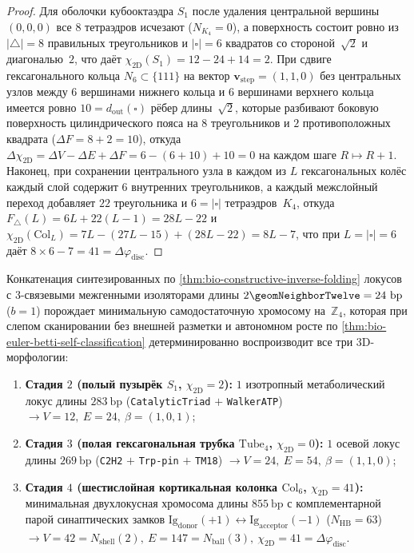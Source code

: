 \begin{proof}
Для оболочки кубооктаэдра $S_1$ после удаления центральной вершины $(0,0,0)$ все $8$ тетраэдров исчезают ($N_{K_4}=0$), а поверхность состоит ровно из $|\triangle|=8$ правильных треугольников и $|\square|=6$ квадратов со стороной~$\sqrt{2}$ и диагональю~$2$, что даёт $\chi_{\mathrm{2D}}(S_1) = 12 - 24 + 14 = 2$.
При сдвиге гексагонального кольца $N_6\subset\{111\}$ на вектор $\mathbf{v}_{\mathrm{step}}=(1,1,0)$ без центральных узлов между $6$ вершинами нижнего кольца и $6$ вершинами верхнего кольца имеется ровно $10 = d_{\mathrm{out}}(\square)$ рёбер длины~$\sqrt{2}$, которые разбивают боковую поверхность цилиндрического пояса на $8$ треугольников и $2$ противоположных квадрата ($\Delta F = 8 + 2 = 10$), откуда $\Delta\chi_{\mathrm{2D}} = \Delta V - \Delta E + \Delta F = 6 - (6 + 10) + 10 = 0$ на каждом шаге $R \mapsto R + 1$.
Наконец, при сохранении центрального узла в каждом из $L$ гексагональных колёс каждый слой содержит $6$ внутренних треугольников, а каждый межслойный переход добавляет $22$ треугольника и $6 = |\square|$ тетраэдров~$K_4$, откуда $F_\triangle(L) = 6L + 22(L-1) = 28L - 22$ и $\chi_{\mathrm{2D}}(\mathrm{Col}_L) = 7L - (27L - 15) + (28L - 22) = 8L - 7$, что при $L = |\square| = 6$ даёт $8\times 6 - 7 = 41 = \Delta\varphi_{\mathrm{disc}}$.
\end{proof}

\begin{corollary}
\label{cor:bio-chromosome-to-organ-and-observer}
Конкатенация синтезированных по \cref{thm:bio-constructive-inverse-folding} локусов с $3$-связевыми межгенными изоляторами длины $2\geomNeighborTwelve = 24\ \mathrm{bp}$ ($b = 1$) порождает минимальную самодостаточную хромосому на~$\mathbb{Z}_4$, которая при слепом сканировании без внешней разметки и автономном росте по \cref{thm:bio-euler-betti-self-classification} детерминированно воспроизводит все три 3D-морфологии:
\begin{enumerate}[leftmargin=*,noitemsep]
\item \textbf{Стадия $2$ (полый пузырёк $S_1$, $\chi_{\mathrm{2D}}=2$):} $1$ изотропный метаболический локус длины $283\ \mathrm{bp}$ (\texttt{CatalyticTriad} $+$ \texttt{WalkerATP}) $\longrightarrow V=12,\ E=24,\ \beta=(1,0,1)$;
\item \textbf{Стадия $3$ (полая гексагональная трубка $\mathrm{Tube}_4$, $\chi_{\mathrm{2D}}=0$):} $1$ осевой локус длины $269\ \mathrm{bp}$ (\texttt{C2H2} $+$ \texttt{Trp-pin} $+$ \texttt{TM18}) $\longrightarrow V=24,\ E=54,\ \beta=(1,1,0)$;
\item \textbf{Стадия $4$ (шестислойная кортикальная колонка $\mathrm{Col}_6$, $\chi_{\mathrm{2D}}=41$):} минимальная двухлокусная хромосома длины $855\ \mathrm{bp}$ с комплементарной парой синаптических замков $\text{Ig}_{\mathrm{donor}}(+1)\leftrightarrow\text{Ig}_{\mathrm{acceptor}}(-1)$ ($N_{\mathrm{HB}}=63$) $\longrightarrow V=42=N_{\mathrm{shell}}(2),\ E=147=N_{\mathrm{ball}}(3),\ \chi_{\mathrm{2D}}=41=\Delta\varphi_{\mathrm{disc}}$.
\end{enumerate}
\end{corollary}

